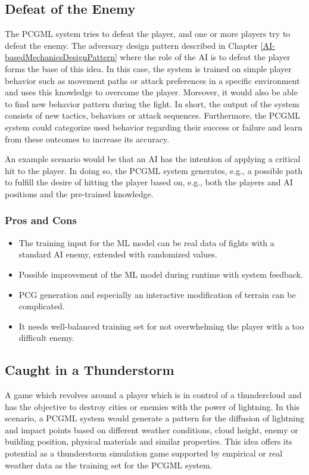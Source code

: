 \documentclass[MGS,Master,english]{twbook}%
\begin{document}
\subsection{Defeat of the Enemy} \label{idea::defeatTheEnemy}
The \ac{PCGML} system tries to defeat the player, and one or more players try to defeat the enemy. The adversary design pattern described in Chapter \ref{AI-basedMechanicsDesignPattern} where the role of the \ac{AI} is to defeat the player forms the base of this idea. In this case, the system is trained on simple player behavior such as movement paths or attack preferences in a specific environment and uses this knowledge to overcome the player. Moreover, it would also be able to find new behavior pattern during the fight. In short, the output of the system consists of new tactics, behaviors or attack sequences. Furthermore, the \ac{PCGML} system could categorize used behavior regarding their success or failure and learn from these outcomes to increase its accuracy. 

An example scenario would be that an \ac{AI} has the intention of applying a critical hit to the player. In doing so, the \ac{PCGML} system generates, e.g., a possible path to fulfill the desire of hitting the player based on, e.g., both the players and \ac{AI} positions and the pre-trained knowledge.

\subsubsection{Pros and Cons}
\begin{itemize}
	\item The training input for the \ac{ML} model can be real data of fights with a standard \ac{AI} enemy, extended with randomized values.
	\item Possible improvement of the \ac{ML} model during runtime with system feedback.
	\item \ac{PCG} generation and especially an interactive modification of terrain can be complicated.
	\item It needs well-balanced training set for not overwhelming the player with a too difficult enemy.
\end{itemize}


\subsection{Caught in a Thunderstorm} \label{idea::caughtInAThunderstorm}
A game which revolves around a player which is in control of a thundercloud and has the objective to destroy cities or enemies with the power of lightning. In this scenario, a \ac{PCGML} system would generate a pattern for the diffusion of lightning and impact points based on different weather conditions, cloud height, enemy or building position, physical materials and similar properties. This idea offers its potential as a thunderstorm simulation game supported by empirical or real weather data as the training set for the \ac{PCGML} system.
\end{document}
